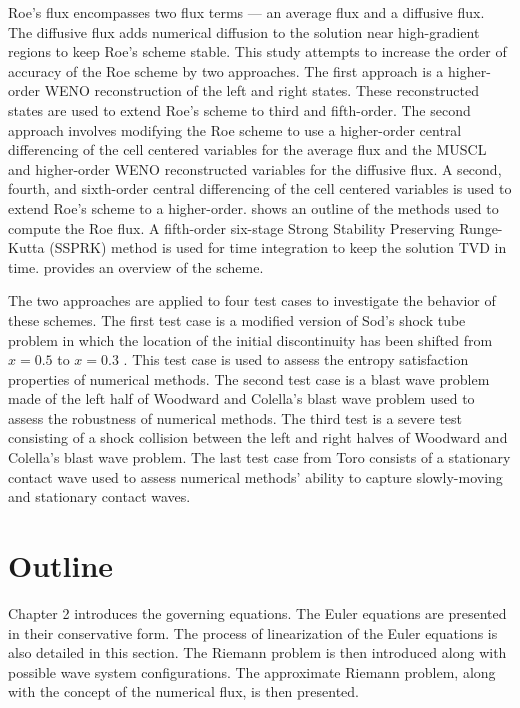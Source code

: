 Roe's flux encompasses two flux terms --- an average flux and a diffusive flux. The diffusive flux adds numerical diffusion to the solution near high-gradient regions to keep Roe's scheme stable. This study attempts to increase the order of accuracy of the Roe scheme by two approaches. The first approach is a higher-order WENO reconstruction of the left and right states. These reconstructed states are used to extend Roe's scheme to third and fifth-order. The second approach involves modifying the Roe scheme to use a higher-order central differencing of the cell centered variables for the average flux and the MUSCL and higher-order WENO reconstructed variables for the diffusive flux. A second, fourth, and sixth-order central differencing of the cell centered variables is used to extend Roe's scheme to a higher-order.  shows an outline of the methods used to compute the Roe flux. A fifth-order six-stage Strong Stability Preserving Runge-Kutta (SSPRK) method is used for time integration to keep the solution TVD in time.  provides an overview of the scheme.

The two approaches are applied to four test cases to investigate the behavior of these schemes. The first test case is a modified version of Sod's \cite{SOD19781} shock tube problem in which the location of the initial discontinuity has been shifted from $x=0.5$ to $x=0.3$ . This test case is used to assess the entropy satisfaction properties of numerical methods. The second test case is a blast wave problem made of the left half of Woodward and Colella's \cite{WOODWARD1984115} blast wave problem used to assess the robustness of numerical methods. The third test is a severe test consisting of a shock collision between the left and right halves of Woodward and Colella's blast wave problem. The last test case from Toro \cite{toro2013riemann} consists of a stationary contact wave used to assess numerical methods' ability to capture slowly-moving and stationary contact waves.

\section{Outline}
Chapter 2 introduces the governing equations. The Euler equations are presented in their conservative form. The process of linearization of the Euler equations is also detailed in this section. The Riemann problem is then introduced along with possible wave system configurations. The approximate Riemann problem, along with the concept of the numerical flux, is then presented.

